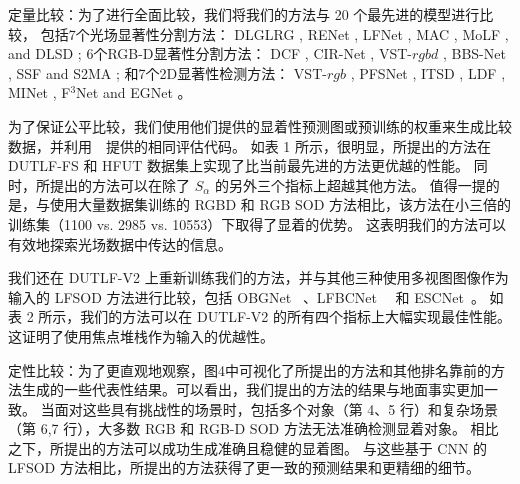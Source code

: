 定量比较：为了进行全面比较，我们将我们的方法与 20 个最先进的模型进行比较，
包括7个光场显著性分割方法：
DLGLRG \cite{liu2021light}, RENet \cite{piao2020exploit}, LFNet \cite{zhang2020lfnet},
MAC \cite{zhang2020light}, MoLF \cite{zhang2019memory}, and DLSD \cite{piao2019deep};
%
%
%
%
6个RGB-D显著性分割方法：
DCF \cite{ji2021calibrated}, CIR-Net \cite{cong2022cir}, VST-$rgbd$  \cite{liu2021visual},
BBS-Net     \cite{fan2020bbs}, SSF     \cite{zhang2020select} and S2MA    \cite{liu2020learning};
%
%
%
%
%
和7个2D显著性检测方法：
VST-$rgb$ \cite{liu2021visual}, PFSNet \cite{ma2021pyramidal}, ITSD \cite{zhou2020interactive},
LDF \cite{wei2020label}, MINet \cite{pang2020multi}, 
F$^{3}$Net  \cite{wei2020f3net} and EGNet   \cite{zhao2019egnet}。
%
%
%
%
%
\par
%
%
为了保证公平比较，我们使用他们提供的显着性预测图或预训练的权重来生成比较数据，并利用~\cite{liu2021visual}~提供的相同评估代码。 如表 1 所示，很明显，所提出的方法在 DUTLF-FS 和 HFUT 数据集上实现了比当前最先进的方法更优越的性能。 同时，所提出的方法可以在除了 $ S_{\alpha} $ 的另外三个指标上超越其他方法。 值得一提的是，与使用大量数据集训练的 RGBD 和 RGB SOD 方法相比，该方法在小三倍的训练集（1100 vs. 2985 vs. 10553）下取得了显着的优势。 这表明我们的方法可以有效地探索光场数据中传达的信息。 
%
%
%
%
\par
%
%
%
我们还在 DUTLF-V2 上重新训练我们的方法，并与其他三种使用多视图图像作为输入的 LFSOD 方法进行比较，包括 OBGNet ~\cite{jing2021occlusion}、LFBCNet~\cite{wang2022lfbcnet}~ 和 ESCNet~\cite{zhang2022exploring}。 如表 2 所示，我们的方法可以在 DUTLF-V2 的所有四个指标上大幅实现最佳性能。 这证明了使用焦点堆栈作为输入的优越性。 
%
%
%
%
%
\par
%
%
定性比较：为了更直观地观察，图4中可视化了所提出的方法和其他排名靠前的方法生成的一些代表性结果。可以看出，我们提出的方法的结果与地面事实更加一致。 当面对这些具有挑战性的场景时，包括多个对象（第 4、5 行）和复杂场景（第 6,7 行），大多数 RGB 和 RGB-D SOD 方法无法准确检测显着对象。 相比之下，所提出的方法可以成功生成准确且稳健的显着图。 与这些基于 CNN 的 LFSOD 方法相比，所提出的方法获得了更一致的预测结果和更精细的细节。


